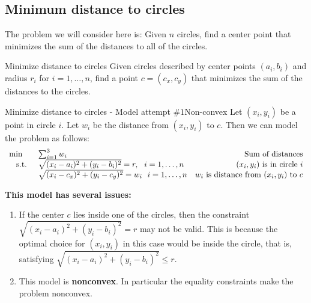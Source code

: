 \subsection{Minimum distance to circles}

The problem we will consider here is:
Given $n$ circles, find a center point that minimizes the sum of the distances to all of the circles. 

\begin{general}{Minimize distance to circles}{}%
Given circles described by center points $(a_i, b_i)$ and radius $r_i$ for $i=1, \dots, n$, find a point $c = (c_x,c_y)$ that minimizes the sum of the distances to the circles.  \\
\end{general}

\begin{center}
\end{center}

\begin{general}{Minimize distance to circles - Model attempt $\#1$}{Non-convex}
Let $(x_i,y_i)$ be a point in circle $i$.  Let $w_i$ be the distance from $(x_i, y_i)$ to $c$.  Then we can  model the problem as follows:
\begin{equation}
\begin{array}{rlr}
\min \quad & \sum_{i=1}^3 w_i \hfill & \text{ Sum of distances}\\
\text{ s.t. } &  \sqrt{(x_i - a_i)^2  + (y_i - b_i)^2}  = r , \ \ i=1,\dots, n& \text{ $(x_i, y_i)$ is in circle $i$}\\
& \sqrt{(x_i - c_x)^2 + (y_i - c_y)^2} = w_i \ \ i=1, \dots, n & \text{$w_i$ is distance from $(x_i, y_i)$ to $c$}\\
\end{array}
\end{equation}
\end{general}

\textbf{This model has several issues:}
\begin{enumerate}
\item  If the center $c$ lies inside one of the circles, then the constraint  $\sqrt{(x_i - a_i)^2  + (y_i - b_i)^2}  = r$ may not be valid.  This is because the optimal choice for $(x_i,y_i)$ in this case would be inside the circle, that is, satisfying $ \sqrt{(x_i - a_i)^2  + (y_i - b_i)^2}  \leq r$.
\item This model is \textbf{nonconvex}.  In particular the equality constraints make the problem nonconvex.
\end{enumerate}

